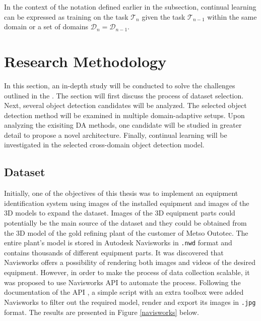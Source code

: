 \documentclass[english, 12pt, a4paper, elec, utf8, a-1b, online]{aaltothesis}
\begin{document}
In the context of the notation defined earlier in the   subsection, continual learning can be expressed as training on the task $\mathcal{T}_n$ given the task $\mathcal{T}_{n-1}$ within the same domain or a set of domains $\mathcal{D}_{n} = \mathcal{D}_{n-1}$.   


\clearpage 

\section{Research Methodology}
\label{Methodology}

In this section, an in-depth study will be conducted to solve the challenges outlined in the . The section will first discuss the process of dataset selection. Next, several object detection candidates will be analyzed.  The selected object detection method will be examined in multiple domain-adaptive setups. Upon analyzing the exisiting DA methods, one candidate will be studied in greater detail to propose a novel architecture. Finally, continual learning will be investigated in the selected cross-domain object detection model. 


\subsection{Dataset}
\label{datasets} 
Initially, one of the objectives of this thesis was to implement an equipment identification system using images of the installed equipment and images of the 3D models to expand the dataset. Images of the 3D equipment parts could potentially be the main source of the dataset and they could be obtained from the 3D model of the gold refining plant of the customer of Metso Outotec. The entire plant's model is stored in Autodesk Navisworks in \texttt{.nwd} format and contains thousands of different equipment parts. It was discovered that Navisworks offers a possibility of rendering both images and videos of the desired equipment. However, in order to make the process of data collection scalable, it was proposed to use Navisworks API to automate the process. Following the documentation of the API \cite{navisworks}, a simple script with an extra toolbox were added Navisworks to filter out the required model, render and export its images in \texttt{.jpg} format. The results are presented in Figure \ref{navisworks} below.
\end{document}

